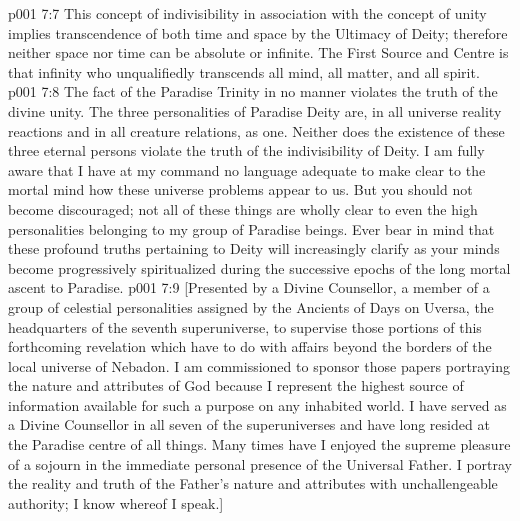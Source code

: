 \vs p001 7:7 This concept of indivisibility in association with the concept of unity implies transcendence of both time and space by the Ultimacy of Deity; therefore neither space nor time can be absolute or infinite. The First Source and Centre is that infinity who unqualifiedly transcends all mind, all matter, and all spirit.
\vs p001 7:8 The fact of the Paradise Trinity in no manner violates the truth of the divine unity. The three personalities of Paradise Deity are, in all universe reality reactions and in all creature relations, as one. Neither does the existence of these three eternal persons violate the truth of the indivisibility of Deity. I am fully aware that I have at my command no language adequate to make clear to the mortal mind how these universe problems appear to us. But you should not become discouraged; not all of these things are wholly clear to even the high personalities belonging to my group of Paradise beings. Ever bear in mind that these profound truths pertaining to Deity will increasingly clarify as your minds become progressively spiritualized during the successive epochs of the long mortal ascent to Paradise.
\vsetoff
\vs p001 7:9 [Presented by a Divine Counsellor, a member of a group of celestial personalities assigned by the Ancients of Days on Uversa, the headquarters of the seventh superuniverse, to supervise those portions of this forthcoming revelation which have to do with affairs beyond the borders of the local universe of Nebadon. I am commissioned to sponsor those papers portraying the nature and attributes of God because I represent the highest source of information available for such a purpose on any inhabited world. I have served as a Divine Counsellor in all seven of the superuniverses and have long resided at the Paradise centre of all things. Many times have I enjoyed the supreme pleasure of a sojourn in the immediate personal presence of the Universal Father. I portray the reality and truth of the Father’s nature and attributes with unchallengeable authority; I know whereof I speak.]
\quizlink
